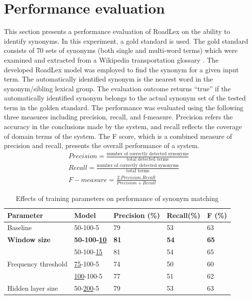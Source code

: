\documentclass[Journal,InsideFigs, DoubleSpace]{ascelike} %
\begin{document}
\section{Performance evaluation} \label{sec:eval_RoadLex}
This section presents a performance evaluation of RoadLex on the ability to identify synonyms. In this experiment, a gold standard  is used. The gold standard consists of 70 sets of synonyms (both single and multi-word terms) which were examined and extracted from a Wikipedia transportation glossary \cite{wikipedia16}. The developed RoadLex model was employed to find the synonym for a given input term. The automatically identified synonym is the nearest word in the synonym/sibling lexical group. The evaluation outcome returns ``true'' if the automatically identified synonym belongs to the actual synonym set of the tested term in the golden standard. The performance was evaluated using the following three measures including precision, recall, and f-measure. Precision refers the accuracy in the conclusions made by the system, and recall reflects the coverage of domain terms of the system. The F score, which is a combined measure of precision and recall, presents the overall performance of a system. 
%
\begin{align} 
&Precision = \frac{\text{number of correctly detected synonyms}}{\text{total detected terms}}  \\
&Recall = \frac{\text{number of correctly detected synonyms}}{\text{total terms}}  \\ 
&F-measure = \frac{2.Precision.Recall}{Precision+Recall}
\end{align}
\begin{table} [b] 
	\caption{Effects of training parameters on performance of synonym matching}
	\label{table:eval_syn_par_effect}
	\centering
	\small
	\renewcommand{\arraystretch}{1.25}
	\begin{tabular}{l l l l l }
		\hline
		\hline
		\textbf{Parameter} & \textbf{Model} & \textbf{Precision (\%)}  & \textbf{Recall(\%)} & \textbf{F (\%)}\\
		\hline
		Baseline	&	50-100-5	&79		&53		&63\\
		\hline
		\textbf{Window size}	&\textbf{50-100-\underline{10}}	&\textbf{81}		&\textbf{54}		&\textbf{65}\\
		&50-100-\underline{15}	&81		&54		&65\\
		\hline		
		Frequency threshold	&\underline{75}-100-5	&74		&50		&60\\
		&\underline{100}-100-5	&77		&51		&62\\
		\hline
		Hidden layer size	&50-\underline{200}-5	&79		&53		&63\\
		\hline
		\hline
	\end{tabular}
	\normalsize
\end{table}
\end{document}
